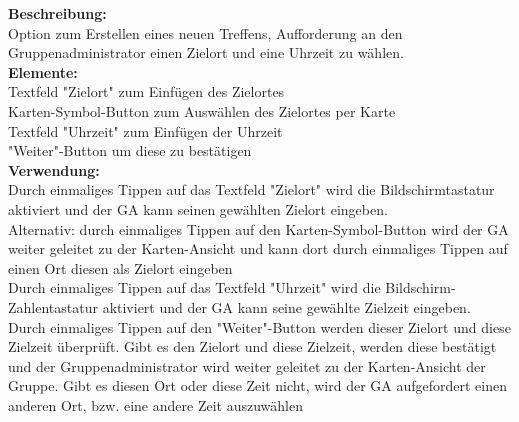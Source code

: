 \begin{figure}
\end{figure}

\textbf{Beschreibung:}\\
Option zum Erstellen eines neuen Treffens, Aufforderung an den Gruppenadministrator einen Zielort und eine Uhrzeit zu wählen.\\
\textbf{Elemente:}\\
Textfeld "Zielort" zum Einfügen des Zielortes\\
Karten-Symbol-Button zum Auswählen des Zielortes per Karte\\
Textfeld "Uhrzeit" zum Einfügen der Uhrzeit\\
"Weiter"-Button um diese zu bestätigen\\
\textbf{Verwendung:}\\
Durch einmaliges Tippen auf das Textfeld "Zielort" wird die Bildschirmtastatur aktiviert und der GA kann seinen gewählten Zielort eingeben.\\
Alternativ: durch einmaliges Tippen auf den Karten-Symbol-Button wird der GA weiter geleitet zu der Karten-Ansicht und kann dort durch einmaliges Tippen auf einen Ort diesen als Zielort eingeben\\
Durch einmaliges Tippen auf das Textfeld "Uhrzeit" wird die Bildschirm-Zahlentastatur aktiviert und der GA kann seine gewählte Zielzeit eingeben.\\
Durch einmaliges Tippen auf den "Weiter"-Button werden dieser Zielort und diese Zielzeit überprüft. Gibt es den Zielort und diese Zielzeit, werden diese bestätigt und der Gruppenadministrator wird weiter geleitet zu der Karten-Ansicht der Gruppe. Gibt es diesen Ort oder diese Zeit nicht, wird der GA aufgefordert einen anderen Ort, bzw. eine andere Zeit auszuwählen
\newpage



